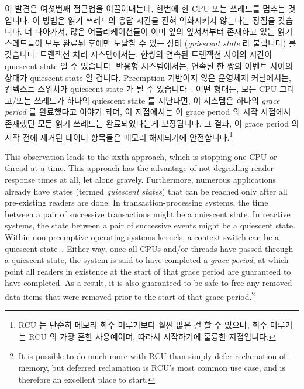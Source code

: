 이 발견은 여섯번째 접근법을 이끌어내는데, 한번에 한 CPU 또는 쓰레드를 멈추는
것입니다.
이 방법은 읽기 쓰레드의 응답 시간을 전혀 악화시키지 않는다는 장점을 갖습니다.
더 나아가서, 많은 어플리케이션들이 이미 앞의 앞서서부터 존재하고 있는 읽기
스레드들이 모두 완료된 후에만 도달할 수 있는 상태 (\emph{quiescent state} 라
불립니다) 를 갖습니다.
트랜잭션 처리 시스템에서는, 한쌍의 연속된 트랜잭션 사이의 시간이 quiescent
state 일 수 있습니다.
반응형 시스템에서는, 연속된 한 쌍의 이벤트 사이의 상태가 quiescent state 일
겁니다.
Preemption 기반이지 않은 운영체제 커널에서는, 컨텍스트 스위치가 quiescent state
가 될 수 있습니다~\cite{McKenney98}.
어떤 형태든, 모든 CPU 그리고/또는 쓰레드가 하나의 quiescent state 를 지난다면,
이 시스템은 하나의 \emph{grace period} 를 완료했다고 이야기 되며, 이 지점에서는
이 grace period 의 시작 시점에서 존재했던 모든 읽기 쓰레드는 완료되었다는게
보장됩니다.
그 결과, 이 grace period 의 시작 전에 제거된 데이터 항목들은 메모리 해제되기에
안전합니다.\footnote{
	RCU 는 단순히 메모리 회수 미루기보다 훨씬 많은 걸 할 수 있으나, 
	회수 미루기는 RCU 의 가장 흔한 사용예이며, 따라서 시작하기에 훌륭한
	지점입니다.}

\iffalse

This observation leads to the sixth approach, which is stopping
one CPU or thread at a time.
This approach has the advantage of not degrading reader response times
at all, let alone gravely.
Furthermore, numerous applications already have states (termed
\emph{quiescent states}) that can be
reached only after all pre-existing readers are done.
In transaction-processing systems, the time between a pair of
successive transactions might be a quiescent state.
In reactive systems, the state between a pair of successive events
might be a quiescent state.
Within non-preemptive operating-systems kernels, a context switch can be
a quiescent state~\cite{McKenney98}.
Either way, once all CPUs and/or threads have passed through a quiescent
state, the system is said to have completed a \emph{grace period},
at which point all readers in existence at the start of that grace period
are guaranteed to have completed.
As a result, it is also guaranteed to be safe to free any removed data
items that were removed prior to the start of that grace period.\footnote{
	It is possible to do much more with RCU than simply defer
	reclamation of memory, but deferred reclamation is RCU's most
	common use case, and is therefore an excellent place to start.}

